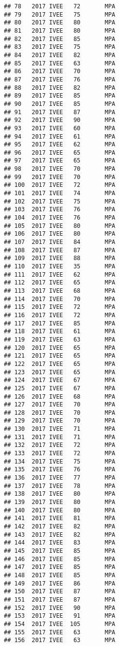 \documentclass[]{article}
\begin{document}
\begin{verbatim}
## 78   2017 IVEE   72       MPA
## 79   2017 IVEE   75       MPA
## 80   2017 IVEE   80       MPA
## 81   2017 IVEE   80       MPA
## 82   2017 IVEE   85       MPA
## 83   2017 IVEE   75       MPA
## 84   2017 IVEE   82       MPA
## 85   2017 IVEE   63       MPA
## 86   2017 IVEE   70       MPA
## 87   2017 IVEE   76       MPA
## 88   2017 IVEE   82       MPA
## 89   2017 IVEE   85       MPA
## 90   2017 IVEE   85       MPA
## 91   2017 IVEE   87       MPA
## 92   2017 IVEE   90       MPA
## 93   2017 IVEE   60       MPA
## 94   2017 IVEE   61       MPA
## 95   2017 IVEE   62       MPA
## 96   2017 IVEE   65       MPA
## 97   2017 IVEE   65       MPA
## 98   2017 IVEE   70       MPA
## 99   2017 IVEE   70       MPA
## 100  2017 IVEE   72       MPA
## 101  2017 IVEE   74       MPA
## 102  2017 IVEE   75       MPA
## 103  2017 IVEE   76       MPA
## 104  2017 IVEE   76       MPA
## 105  2017 IVEE   80       MPA
## 106  2017 IVEE   80       MPA
## 107  2017 IVEE   84       MPA
## 108  2017 IVEE   87       MPA
## 109  2017 IVEE   88       MPA
## 110  2017 IVEE   35       MPA
## 111  2017 IVEE   62       MPA
## 112  2017 IVEE   65       MPA
## 113  2017 IVEE   68       MPA
## 114  2017 IVEE   70       MPA
## 115  2017 IVEE   72       MPA
## 116  2017 IVEE   72       MPA
## 117  2017 IVEE   85       MPA
## 118  2017 IVEE   61       MPA
## 119  2017 IVEE   63       MPA
## 120  2017 IVEE   65       MPA
## 121  2017 IVEE   65       MPA
## 122  2017 IVEE   65       MPA
## 123  2017 IVEE   65       MPA
## 124  2017 IVEE   67       MPA
## 125  2017 IVEE   67       MPA
## 126  2017 IVEE   68       MPA
## 127  2017 IVEE   70       MPA
## 128  2017 IVEE   70       MPA
## 129  2017 IVEE   70       MPA
## 130  2017 IVEE   71       MPA
## 131  2017 IVEE   71       MPA
## 132  2017 IVEE   72       MPA
## 133  2017 IVEE   72       MPA
## 134  2017 IVEE   75       MPA
## 135  2017 IVEE   76       MPA
## 136  2017 IVEE   77       MPA
## 137  2017 IVEE   78       MPA
## 138  2017 IVEE   80       MPA
## 139  2017 IVEE   80       MPA
## 140  2017 IVEE   80       MPA
## 141  2017 IVEE   81       MPA
## 142  2017 IVEE   82       MPA
## 143  2017 IVEE   82       MPA
## 144  2017 IVEE   83       MPA
## 145  2017 IVEE   85       MPA
## 146  2017 IVEE   85       MPA
## 147  2017 IVEE   85       MPA
## 148  2017 IVEE   85       MPA
## 149  2017 IVEE   86       MPA
## 150  2017 IVEE   87       MPA
## 151  2017 IVEE   87       MPA
## 152  2017 IVEE   90       MPA
## 153  2017 IVEE   91       MPA
## 154  2017 IVEE  105       MPA
## 155  2017 IVEE   63       MPA
## 156  2017 IVEE   63       MPA

\end{verbatim}
\end{document}
